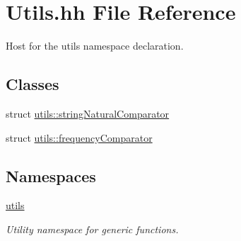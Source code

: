 \hypertarget{_utils_8hh}{}\section{Utils.\+hh File Reference}
\label{_utils_8hh}


Host for the utils namespace declaration.  


\subsection*{Classes}
\begin{DoxyCompactItemize}
\item 
struct \hyperlink{structutils_1_1string_natural_comparator}{utils\+::string\+Natural\+Comparator}
\item 
struct \hyperlink{structutils_1_1frequency_comparator}{utils\+::frequency\+Comparator}
\end{DoxyCompactItemize}
\subsection*{Namespaces}
\begin{DoxyCompactItemize}
\item 
 \hyperlink{namespaceutils}{utils}
\begin{DoxyCompactList}\small\item\em Utility namespace for generic functions. \end{DoxyCompactList}\end{DoxyCompactItemize}
